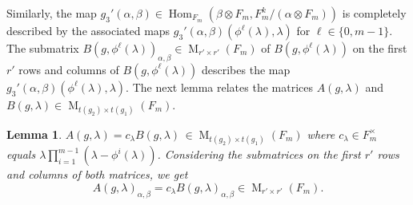 \documentclass[reqno]{amsart}
\newtheorem{lemma}[theorem]{Lemma}
\theoremstyle{definition}
\theoremstyle{remark}
\numberwithin{equation}{section}
\DeclareMathOperator{\Hom}{Hom}
\DeclareMathOperator{\M}{M}
\begin{document}
{Similarly, the map $g_3'(\alpha, \beta) \in \Hom_{F_m}( \beta \otimes F_m, F_m^k/(\alpha \otimes F_m))$ is completely described by the associated maps  $g_3'(\alpha, \beta)(\phi^\ell(\lambda), \lambda)$ for $\ell \in \{0, m-1\}$. The 
submatrix $B(g,\phi^\ell(\lambda))_{\alpha, \beta} \in \M_{r' \times r'}(F_m)$ of 
$B(g, \phi^\ell(\lambda))$ on the first $r'$ rows and columns of $B(g,\phi^\ell(\lambda))$
describes the map $g_3'(\alpha,\beta)(\phi^\ell(\lambda), \lambda)$.
The next lemma relates the matrices $A(g,\lambda)$ and $ B(g, \lambda) \in \M_{t(g_2) \times t(g_1)}(F_m)$.

\begin{lemma} \label{lem_C(g)_g_3}
   $A(g, \lambda)= c_\lambda   B(g, \lambda) \, \in \M_{t(g_2) \times t(g_1)}(F_m)$ where $c_\lambda \in F_m^\times$ equals $\lambda \prod_{i=1}^{m-1}(\lambda- \phi^i(\lambda))$.     Considering the submatrices on the first $r'$ rows and columns of both matrices, we get \[A(g, \lambda)_{\alpha, \beta}= c_\lambda   B(g, \lambda)_{\alpha, \beta} \in \M_{r' \times r'}(F_m).\]
\end{lemma}

}
\end{document}
